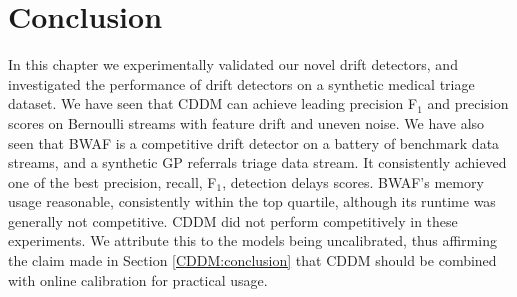 
\section{Conclusion} \label{Experiments:conclusion}

In this chapter we experimentally validated our novel drift detectors, and investigated the performance of drift detectors on a synthetic medical triage dataset. We have seen that CDDM can achieve leading precision F$_1$ and precision scores on Bernoulli streams with feature drift and uneven noise. We have also seen that BWAF is a competitive drift detector on a battery of benchmark data streams, and a synthetic GP referrals triage data stream. It consistently achieved one of the best precision, recall, F$_1$, detection delays scores. BWAF's memory usage reasonable, consistently within the top quartile, although its runtime was generally not competitive. CDDM did not perform competitively in these experiments. We attribute this to the models being uncalibrated, thus affirming the claim made in Section \ref{CDDM:conclusion} that CDDM should be combined with online calibration for practical usage.